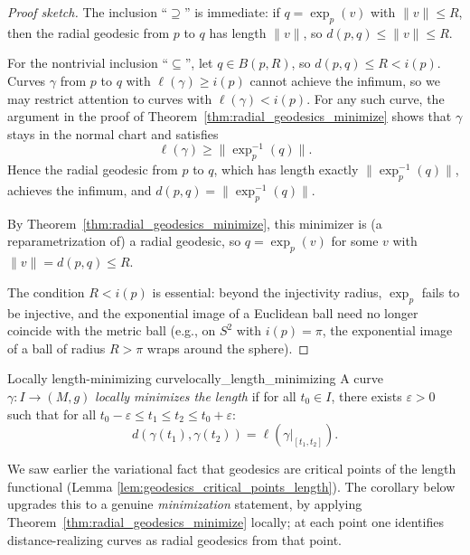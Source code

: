 \begin{proof}[Proof sketch]
The inclusion ``$\supseteq$'' is immediate: if $q = \exp_p(v)$ with $\|v\| \leqslant R$, then the radial geodesic from $p$ to $q$ has length $\|v\|$, so $d(p, q) \leqslant \|v\| \leqslant R$.

For the nontrivial inclusion ``$\subseteq$'', let $q \in B(p,R)$, so $d(p,q) \leqslant R < i(p)$. Curves $\gamma$ from $p$ to $q$ with $\ell(\gamma) \geqslant i(p)$ cannot achieve the infimum, so we may restrict attention to curves with $\ell(\gamma) < i(p)$. For any such curve, the argument in the proof of Theorem~\ref{thm:radial_geodesics_minimize} shows
that $\gamma$ stays in the normal chart and satisfies
\[
\ell(\gamma) \geqslant \|\exp_p^{-1}(q)\|.
\]
Hence the radial geodesic from $p$ to $q$, which has length exactly $\|\exp_p^{-1}(q)\|$, achieves the infimum, and $d(p, q) = \|\exp_p^{-1}(q)\|$.

By Theorem~\ref{thm:radial_geodesics_minimize}, this minimizer is (a reparametrization of) a radial geodesic, so $q = \exp_p(v)$ for some $v$ with $\|v\| = d(p, q) \leqslant R$.

The condition $R < i(p)$ is essential: beyond the injectivity radius, $\exp_p$ fails to be injective, and the exponential image of a Euclidean ball need no longer coincide with the metric ball (e.g., on $S^2$ with $i(p) = \pi$, the exponential image of a ball of radius $R > \pi$ wraps around the sphere).
\end{proof}








\begin{colordef}{Locally length-minimizing curve}{locally_length_minimizing}
A curve $\gamma \colon I \to (M,g)$ \emph{locally minimizes the length} if for all $t_0 \in I$, there exists $\varepsilon > 0$ such that for all $t_0 - \varepsilon \leqslant t_1 \leqslant t_2 \leqslant t_0 + \varepsilon$:
\[
d(\gamma(t_1), \gamma(t_2)) = \ell(\gamma|_{[t_1, t_2]}).
\]
\end{colordef}

We saw earlier the variational fact that geodesics are critical points of the length functional (Lemma \ref{lem:geodesics_critical_points_length}). The corollary below upgrades this to a genuine \emph{minimization} statement, by applying Theorem~\ref{thm:radial_geodesics_minimize} locally; at each point one identifies distance-realizing curves as radial geodesics from that point.


